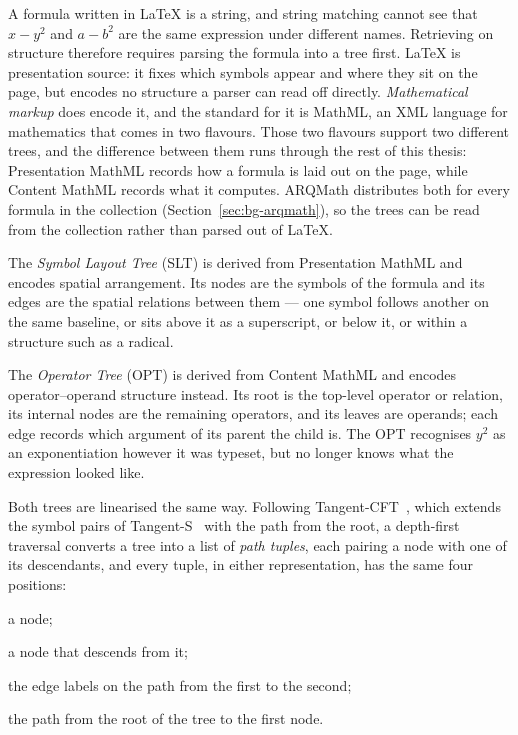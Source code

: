 A formula written in \LaTeX{} is a string, and string matching cannot see that
$x - y^2$ and $a - b^2$ are the same expression under different names. Retrieving
on structure therefore requires parsing the formula into a tree first. \LaTeX{} is
presentation source: it fixes which symbols appear and where they sit on the page,
but encodes no structure a parser can read off directly. \emph{Mathematical
markup} does encode it, and the standard for it is MathML, an XML language for
mathematics that comes in two flavours. Those two flavours support two different
trees, and the difference between them runs through the rest of this thesis:
Presentation MathML records how a formula is laid out on the page, while Content
MathML records what it computes. ARQMath
distributes both for every formula in the collection
(Section~\ref{sec:bg-arqmath}), so the trees can be read from the collection
rather than parsed out of \LaTeX{}.

The \emph{Symbol Layout Tree} (SLT) is derived from Presentation MathML and
encodes spatial arrangement. Its nodes are the symbols of the formula and its
edges are the spatial relations between them --- one symbol follows another on the
same baseline, or sits above it as a superscript, or below it, or within a
structure such as a radical.

The \emph{Operator Tree} (OPT) is derived from Content MathML and encodes
operator--operand structure instead. Its root is the top-level operator or
relation, its internal nodes are the remaining operators, and its leaves are
operands; each edge records which argument of its parent the child is. The OPT
recognises $y^2$ as an exponentiation however it was typeset, but no longer knows
what the expression looked like.

Both trees are linearised the same way. Following
Tangent-CFT~\cite{mansouri2019tangentcft}, which extends the symbol pairs of
Tangent-S~\cite{davila2017tangents} with the path from the root, a depth-first
traversal converts a tree into a list of \emph{path tuples}, each pairing a node
with one of its descendants, and every tuple, in either representation, has the
same four positions:

\begin{description}[leftmargin=4.2em,style=sameline,itemsep=0.15em,topsep=0.4em]
  \item[\textmd{\texttt{[0]}}] a node;
  \item[\textmd{\texttt{[1]}}] a node that descends from it;
  \item[\textmd{\texttt{[2]}}] the edge labels on the path from the first to the second;
  \item[\textmd{\texttt{[3]}}] the path from the root of the tree to the first node.
\end{description}

